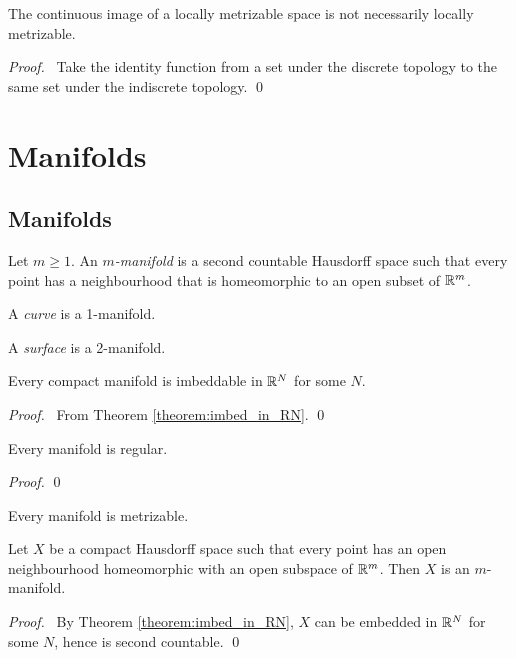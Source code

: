 \begin{proposition}
    The continuous image of a locally metrizable space is not necessarily locally metrizable.
\end{proposition}

\begin{proof}
    \pf\ Take the identity function from a set under the discrete topology
    to the same set under the indiscrete topology. \qed
\end{proof}

\chapter{Manifolds}

\section{Manifolds}

\begin{definition}[Manifold]
    Let $m \geq 1$. An \emph{$m$-manifold} is a second countable Hausdorff space such that every point has a neighbourhood that is
    homeomorphic to an open subset of $\mathbb{R}^m$.

    A \emph{curve} is a 1-manifold.

    A \emph{surface} is a 2-manifold.
\end{definition}

\begin{theorem}
    Every compact manifold is imbeddable in $\mathbb{R}^N$ for some $N$.
\end{theorem}

\begin{proof}
    \pf\ From Theorem \ref{theorem:imbed_in_RN}. \qed
\end{proof}

\begin{proposition}
    Every manifold is regular.
\end{proposition}

\begin{proof}
    \pf
    \qed
\end{proof}

\begin{corollary}
    Every manifold is metrizable.
\end{corollary}

\begin{proposition}
    Let $X$ be a compact Hausdorff space such that every point has an open neighbourhood homeomorphic with an open subspace of $\mathbb{R}^m$.
    Then $X$ is an $m$-manifold.
\end{proposition}

\begin{proof}
    \pf\ By Theorem \ref{theorem:imbed_in_RN}, $X$ can be embedded in $\mathbb{R}^N$ for some $N$, hence is second countable. \qed
\end{proof}